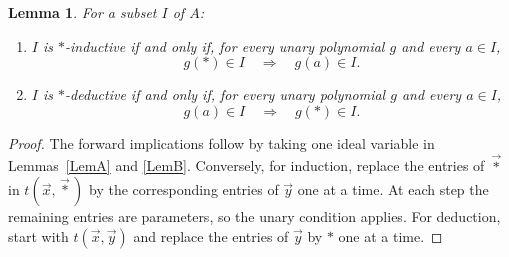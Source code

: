 \documentclass[12pt,english]{amsart}
\newtheorem{lemma}[theorem]{Lemma}
\theoremstyle{definition}
\numberwithin{equation}{section}
\theoremstyle{remark}
\renewcommand{\top}{\ast}
\begin{document}
\begin{samepage}
\begin{lemma}\label{PropUnary}
For a subset $I$ of $A$:
\begin{enumerate}
\item $I$ is $\top$-inductive if and only if, for every unary polynomial $g$ and every $a\in I$,
\[
g(\top)\in I\quad\Longrightarrow\quad g(a)\in I.
\]
\item $I$ is $\top$-deductive if and only if, for every unary polynomial $g$ and every $a\in I$,
\[
g(a)\in I\quad\Longrightarrow\quad g(\top)\in I.
\]
\end{enumerate}
\end{lemma}
\end{samepage}

\begin{proof}
The forward implications follow by taking one ideal variable in Lemmas~\ref{LemA} and \ref{LemB}. Conversely, for induction, replace the entries of $\vec\top$ in $t(\vec x,\vec\top)$ by the corresponding entries of $\vec y$ one at a time. At each step the remaining entries are parameters, so the unary condition applies. For deduction, start with $t(\vec x,\vec y)$ and replace the entries of $\vec y$ by $\top$ one at a time.
\end{proof}
\end{document}
